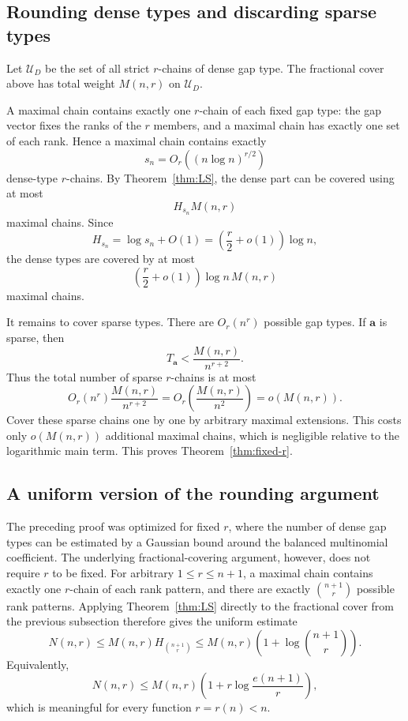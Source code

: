 \documentclass[11pt]{article}
\theoremstyle{definition}
\theoremstyle{remark}
\newcommand{\calU}{\mathcal U}
\newcommand{\balazs}[1]{\textcolor{red}{Balazs: #1}}
\begin{document}
\subsection{Rounding dense types and discarding sparse types}

Let $\calU_D$ be the set of all strict $r$-chains of dense gap type.  The fractional cover above has total weight $M(n,r)$ on $\calU_D$.

A maximal chain contains exactly  one $r$-chain of each fixed gap type: the gap vector fixes the ranks of the $r$ members, and a maximal chain has exactly one set of each rank.  Hence a maximal chain contains exactly
\[
   s_n=O_r((n\log n)^{r/2})
\]
dense-type $r$-chains.  By Theorem~\ref{thm:LS}, the dense part can be covered using at most
\[
   H_{s_n}M(n,r)
\]
maximal chains.  Since
\[
   H_{s_n}=\log s_n+O(1)
   =\left(\frac r2+o(1)\right)\log n,
\]
the dense types are covered by at most
\[
   \left(\frac r2+o(1)\right)\log n\,M(n,r)
\]
maximal chains.

It remains to cover sparse types.  There are $O_r(n^r)$ possible gap types.  If $\mathbf a$ is sparse, then
\[
   T_{\mathbf a}<\frac{M(n,r)}{n^{r+2}}.
\]
Thus the total number of sparse $r$-chains is at most
\[
   O_r(n^r)\frac{M(n,r)}{n^{r+2}}
   =O_r\left(\frac{M(n,r)}{n^2}\right)
   =o(M(n,r)).
\]%
Cover these sparse chains one by one by arbitrary maximal extensions.  This costs only $o(M(n,r))$ additional maximal chains, which is negligible relative to the logarithmic main term.  This proves Theorem~\ref{thm:fixed-r}.

\subsection{A uniform version of the rounding argument}\label{subsec:uniform-rounding}

The preceding proof was optimized for fixed \(r\), where the number of dense gap types can be estimated by a Gaussian bound around the balanced multinomial coefficient. The underlying fractional-covering argument, however, does not require \(r\) to be fixed. For arbitrary \(1\le r\le n+1\), a maximal chain contains exactly  one \(r\)-chain of each rank pattern, and there are exactly \(\binom{n+1}{r}\) possible rank patterns. Applying Theorem~\ref{thm:LS} directly to the fractional cover from the previous subsection therefore gives the uniform estimate
\[
N(n,r)\le M(n,r)H_{\binom{n+1}{r}}
\le M(n,r)\left(1+\log\binom{n+1}{r}\right).
\]
Equivalently,
\[
N(n,r)\le M(n,r)\left(1+r\log\frac{e(n+1)}{r}\right),
\]
which is meaningful for every function \(r=r(n)<n\).
\end{document}
